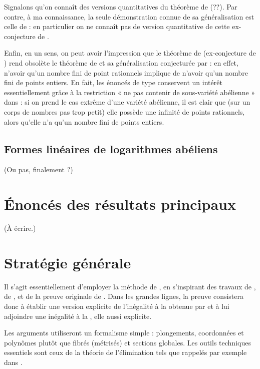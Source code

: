 Signalons qu'on connaît des versions quantitatives du théorème de 
(\todo??). Par contre, à ma connaissance, la seule démonstration connue de sa
généralisation est celle de  : en particulier on ne connaît pas
de version quantitative de cette ex-conjecture de .

Enfin, en un sens, on peut avoir l'impression que le théorème de
 (ex-conjecture de ) rend obsolète le théorème
de  et sa généralisation conjecturée par  : en effet,
n'avoir qu'un nombre fini de point rationnels implique de n'avoir qu'un nombre
fini de points entiers. En fait, les énoncés de type  conservent
un intérêt essentiellement grâce à la restriction « ne pas contenir de
sous-variété abélienne » dans  : si on prend le cas extrême
d'une variété abélienne, il est clair que (sur un corps de nombres pas trop
petit) elle possède une infinité de points rationnels, alors qu'elle n'a qu'un
nombre fini de points entiers.


\subsection{Formes linéaires de logarithmes abéliens}

\todo (Ou pas, finalement ?)


\section{Énoncés des résultats principaux}

\todo (À écrire.)


\section{Stratégie générale}

Il s'agit essentiellement d'employer la méthode de , en s'inspirant
des travaux de  \cite{remivds,remivg,remdcl}, de 
\cite[chap.~2]{farhith}, et de la preuve originale de 
\cite{faldaav}.  Dans les grandes lignes, la preuve consistera donc à établir
une version explicite de l'inégalité à la  obtenue par
 et à lui adjoindre une inégalité à la , elle aussi
explicite.

Les arguments utiliseront un formalisme simple : plongements, coordonnées et
polynômes plutôt que fibrés (métrisés) et sections globales. Les outils
techniques essentiels sont ceux de la théorie de l'élimination tels que
rappelés par exemple dans \cite[chap.~5 à~7]{nesphilnm}.

